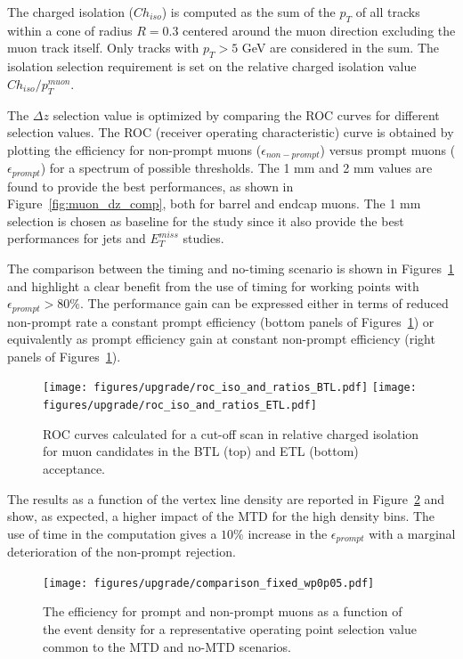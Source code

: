 The charged isolation ($Ch_{iso}$) is computed as the sum of the $p_T$ of all tracks within a cone of radius $R=0.3$ centered
around the muon direction excluding the muon track itself. Only tracks with $p_T > 5$ GeV are considered in the sum.
The isolation selection requirement is set on the relative charged isolation value $Ch_{iso}/p_T^{muon}$.

The $\Delta z$ selection value is optimized by comparing the ROC curves for different selection values.
The ROC (receiver operating characteristic) curve is obtained by plotting the efficiency for
non-prompt muons ($\epsilon_{non-prompt}$) versus prompt muons ($\epsilon_{prompt}$) for a spectrum of possible
\relChIso thresholds.
The 1 mm and 2 mm values are found to provide the best performances, as shown in Figure~\ref{fig:muon_dz_comp}, both
for barrel and endcap muons. The 1 mm selection is chosen as baseline for the study since it also provide the
best performances for jets and $E_T^{miss}$ studies.


The comparison between the timing and no-timing scenario is shown in Figures~\ref{fig:roc_iso_ratio} and highlight
a clear benefit from the use of timing for working points with $\epsilon_{prompt}> 80\%$.
The performance gain can be expressed either in terms of reduced non-prompt rate a constant prompt efficiency
(bottom panels of Figures~\ref{fig:roc_iso_ratio}) or equivalently as prompt efficiency gain at constant non-prompt
efficiency (right panels of Figures~\ref{fig:roc_iso_ratio}).

\begin{figure}[h!]
  \centering
  \texttt{[image: figures/upgrade/roc\_iso\_and\_ratios\_BTL.pdf]}
  \texttt{[image: figures/upgrade/roc\_iso\_and\_ratios\_ETL.pdf]}
  \caption{ROC curves calculated for a cut-off scan in relative charged isolation for muon candidates
    in the BTL (top) and ETL (bottom) acceptance.}
  \label{fig:roc_iso_ratio}
\end{figure}

The results as a function of the vertex line density are reported in Figure~\ref{fig:muon_iso_vs_density} and show,
as expected, a higher impact of the MTD for the high density bins. The use of time in the \relChIso computation
gives a $10\%$ increase in the $\epsilon_{prompt}$ with a marginal deterioration of the non-prompt rejection.

\begin{figure}
  \centering
  \texttt{[image: figures/upgrade/comparison\_fixed\_wp0p05.pdf]}
  \caption{The efficiency for prompt and non-prompt muons as a function of the event density
    for a representative operating point selection value common to the MTD and no-MTD scenarios.}
  \label{fig:muon_iso_vs_density}
\end{figure}

